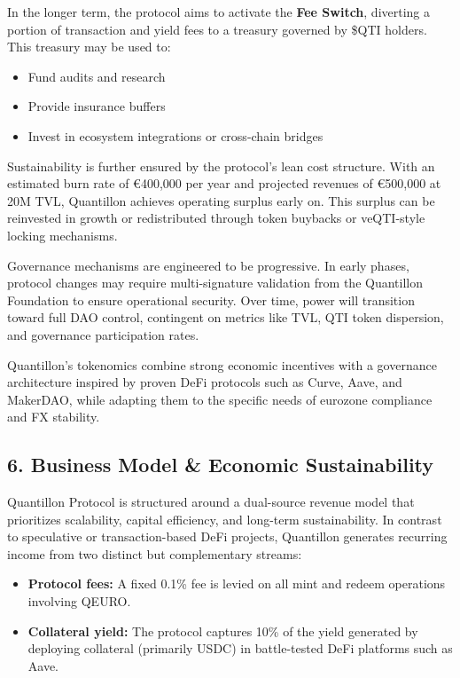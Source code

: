 In the longer term, the protocol aims to activate the \textbf{Fee
Switch}, diverting a portion of transaction and yield fees to a treasury
governed by \$QTI holders. This treasury may be used to:

\begin{itemize}
\item
  Fund audits and research
\item
  Provide insurance buffers
\item
  Invest in ecosystem integrations or cross-chain bridges
\end{itemize}

Sustainability is further ensured by the protocol's lean cost structure.
With an estimated burn rate of €400,000 per year and projected revenues
of €500,000 at 20M TVL, Quantillon achieves operating surplus early on.
This surplus can be reinvested in growth or redistributed through token
buybacks or veQTI-style locking mechanisms.

Governance mechanisms are engineered to be progressive. In early phases,
protocol changes may require multi-signature validation from the
Quantillon Foundation to ensure operational security. Over time, power
will transition toward full DAO control, contingent on metrics like TVL,
QTI token dispersion, and governance participation rates.

Quantillon's tokenomics combine strong economic incentives with a
governance architecture inspired by proven DeFi protocols such as Curve,
Aave, and MakerDAO, while adapting them to the specific needs of
eurozone compliance and FX stability.

\hypertarget{business-model-economic-sustainability}{%
\subsection{6. Business Model \& Economic
Sustainability}\label{business-model-economic-sustainability}}

Quantillon Protocol is structured around a dual-source revenue model
that prioritizes scalability, capital efficiency, and long-term
sustainability. In contrast to speculative or transaction-based DeFi
projects, Quantillon generates recurring income from two distinct but
complementary streams:

\begin{itemize}
\item
  \textbf{Protocol fees:} A fixed 0.1\% fee is levied on all mint and
  redeem operations involving QEURO.
\item
  \textbf{Collateral yield:} The protocol captures 10\% of the yield
  generated by deploying collateral (primarily USDC) in battle-tested
  DeFi platforms such as Aave.
\end{itemize}

